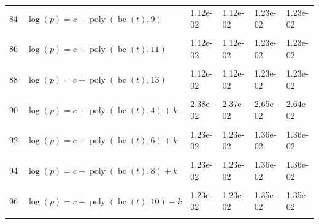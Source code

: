 \documentclass[12pt,a4paper]{article}
\DeclareMathOperator{\bc}{bc}
\DeclareMathOperator{\poly}{poly}
\begin{document}
\begin{longtable}[t]{ll>{\raggedleft\arraybackslash}p{2cm}>{\raggedleft\arraybackslash}p{2cm}>{\raggedleft\arraybackslash}p{2cm}>{\raggedleft\arraybackslash}p{2cm}}
84 & $\log(p) = c + \poly\left( \bc(t), 9 \right)$ & 1.12e-02 & 1.12e-02 & 1.23e-02 & 1.23e-02\\
\cellcolor{gray!6}{85} & \cellcolor{gray!6}{$\log(p) = c + \poly\left( \bc(t), 10 \right)$} & \cellcolor{gray!6}{1.12e-02} & \cellcolor{gray!6}{1.12e-02} & \cellcolor{gray!6}{1.23e-02} & \cellcolor{gray!6}{1.23e-02}\\
86 & $\log(p) = c + \poly\left( \bc(t), 11 \right)$ & 1.12e-02 & 1.12e-02 & 1.23e-02 & 1.23e-02\\
\cellcolor{gray!6}{87} & \cellcolor{gray!6}{$\log(p) = c + \poly\left( \bc(t), 12 \right)$} & \cellcolor{gray!6}{1.12e-02} & \cellcolor{gray!6}{1.12e-02} & \cellcolor{gray!6}{1.23e-02} & \cellcolor{gray!6}{1.23e-02}\\
88 & $\log(p) = c + \poly\left( \bc(t), 13 \right)$ & 1.12e-02 & 1.12e-02 & 1.23e-02 & 1.23e-02\\
\cellcolor{gray!6}{89} & \cellcolor{gray!6}{$\log(p) = c + \poly\left( \bc(t), 3 \right) + k$} & \cellcolor{gray!6}{3.64e-02} & \cellcolor{gray!6}{2.01e-02} & \cellcolor{gray!6}{4.05e-02} & \cellcolor{gray!6}{2.22e-02}\\
90 & $\log(p) = c + \poly\left( \bc(t), 4 \right) + k$ & 2.38e-02 & 2.37e-02 & 2.65e-02 & 2.64e-02\\
\cellcolor{gray!6}{91} & \cellcolor{gray!6}{$\log(p) = c + \poly\left( \bc(t), 5 \right) + k$} & \cellcolor{gray!6}{1.55e-02} & \cellcolor{gray!6}{1.35e-02} & \cellcolor{gray!6}{1.72e-02} & \cellcolor{gray!6}{1.49e-02}\\
92 & $\log(p) = c + \poly\left( \bc(t), 6 \right) + k$ & 1.23e-02 & 1.23e-02 & 1.36e-02 & 1.36e-02\\
\cellcolor{gray!6}{93} & \cellcolor{gray!6}{$\log(p) = c + \poly\left( \bc(t), 7 \right) + k$} & \cellcolor{gray!6}{1.27e-02} & \cellcolor{gray!6}{1.26e-02} & \cellcolor{gray!6}{1.40e-02} & \cellcolor{gray!6}{1.39e-02}\\
94 & $\log(p) = c + \poly\left( \bc(t), 8 \right) + k$ & 1.23e-02 & 1.23e-02 & 1.36e-02 & 1.36e-02\\
\cellcolor{gray!6}{95} & \cellcolor{gray!6}{$\log(p) = c + \poly\left( \bc(t), 9 \right) + k$} & \cellcolor{gray!6}{1.23e-02} & \cellcolor{gray!6}{1.23e-02} & \cellcolor{gray!6}{1.35e-02} & \cellcolor{gray!6}{1.35e-02}\\
96 & $\log(p) = c + \poly\left( \bc(t), 10 \right) + k$ & 1.23e-02 & 1.23e-02 & 1.35e-02 & 1.35e-02\\
\cellcolor{gray!6}{97} & \cellcolor{gray!6}{$\log(p) = c + \poly\left( \bc(t), 11 \right) + k$} & \cellcolor{gray!6}{1.23e-02} & \cellcolor{gray!6}{1.23e-02} & \cellcolor{gray!6}{1.35e-02} & \cellcolor{gray!6}{1.35e-02}\\

\end{longtable}
\end{document}
